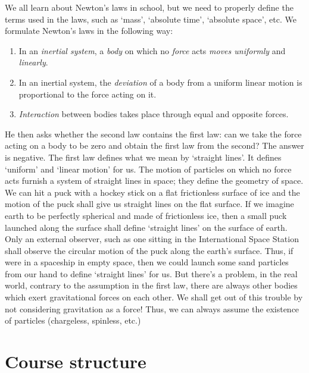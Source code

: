 \documentclass[a4 paper, 12pt]{book}
\theoremstyle{definition}
\begin{document}
    We all learn about Newton's laws in school, but we need to properly define the terms used in the laws, such as `mass', `absolute time', `absolute space', etc. We formulate Newton's laws in the following way:
    \begin{enumerate}
        \item In an \textit{inertial system}, a \textit{body} on which no \textit{force} acts \textit{moves uniformly} and \textit{linearly}.
        \item In an inertial system, the \textit{deviation} of a body from a uniform linear motion is proportional to the force acting on it.
        \item \textit{Interaction} between bodies takes place through equal and opposite forces.
    \end{enumerate}
    He then asks whether the second law contains the first law: can we take the force acting on a body to be zero and obtain the first law from the second? The answer is negative. The first law defines what we mean by `straight lines'. It defines `uniform' and `linear motion' for us. The motion of particles on which no force acts furnish a system of straight lines in space; they define the geometry of space. We  can hit a puck with a hockey stick on a flat frictionless surface of ice and the motion of the puck shall give us straight lines on the flat surface. If we imagine earth to be perfectly spherical and made of frictionless ice, then a small puck launched along the surface shall define `straight lines' on the surface of earth. Only an external observer, such as one sitting in the International Space Station shall observe the circular motion of the puck along the earth's surface. Thus, if were in a spaceship in empty space, then we could launch some sand particles from our hand to define `straight lines' for us. But there's a problem, in the real world, contrary to the assumption in the first law, there are always other bodies which exert gravitational forces on each other. We shall get out of this trouble by not considering gravitation as a force! Thus, we can always assume the existence of particles (chargeless, spinless, etc.)

    \section{Course structure}
\end{document}
